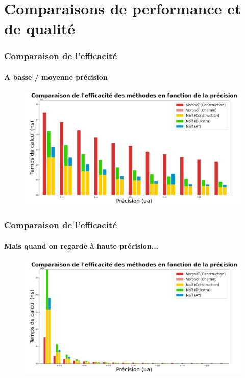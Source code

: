 \section{Comparaisons de performance et de qualité}

\begin{frame}
    \tableofcontents[currentsection]
\end{frame}

\begin{frame}
\frametitle{Comparaison de l'efficacité}
\framesubtitle{A basse / moyenne précision}
\begin{figure}
    \centering
    \includegraphics[width=1\linewidth]{assets/BassePrecision.png}
\end{figure}
\end{frame}


\begin{frame}
\frametitle{Comparaison de l'efficacité}
\framesubtitle{Mais quand on regarde à haute précision...}
\begin{figure}
    \centering
    \includegraphics[width=1\linewidth]{assets/ToutesPrecision.png}
\end{figure}
\end{frame}

